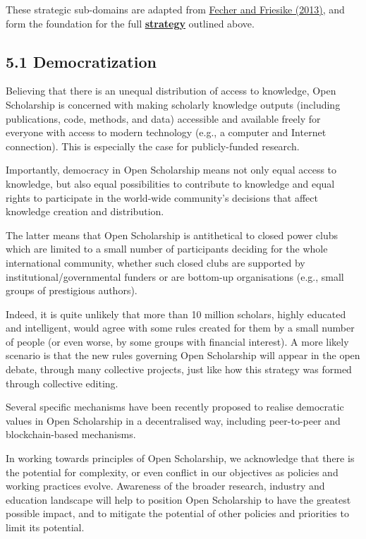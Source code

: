 These strategic sub-domains are adapted from
\href{https://doi.org/10.1007/978-3-319-00026-8_2}{Fecher and Friesike
(2013)}, and form the foundation for the full
\protect\hyperlink{Strategy}{\textbf{strategy}} outlined above.

\subsection{5.1 Democratization }\label{democratization}

Believing that there is an unequal distribution of access to knowledge,
Open Scholarship is concerned with making scholarly knowledge outputs
(including publications, code, methods, and data) accessible and
available freely for everyone with access to modern technology (e.g., a
computer and Internet connection). This is especially the case for
publicly-funded research.

Importantly, democracy in Open Scholarship means not only equal access
to knowledge, but also equal possibilities to contribute to knowledge
and equal rights to participate in the world-wide community's decisions
that affect knowledge creation and distribution.

The latter means that Open Scholarship is antithetical to closed power
clubs which are limited to a small number of participants deciding for
the whole international community, whether such closed clubs are
supported by institutional/governmental funders or are bottom-up
organisations (e.g., small groups of prestigious authors).

Indeed, it is quite unlikely that more than 10 million scholars, highly
educated and intelligent, would agree with some rules created for them
by a small number of people (or even worse, by some groups with
financial interest). A more likely scenario is that the new rules
governing Open Scholarship will appear in the open debate, through many
collective projects, just like how this strategy was formed through
collective editing.

Several specific mechanisms have been recently proposed to realise
democratic values in Open Scholarship in a decentralised way, including
peer-to-peer and blockchain-based mechanisms.

In working towards principles of Open Scholarship, we acknowledge that
there is the potential for complexity, or even conflict in our
objectives as policies and working practices evolve. Awareness of the
broader research, industry and education landscape will help to position
Open Scholarship to have the greatest possible impact, and to mitigate
the potential of other policies and priorities to limit its potential.

